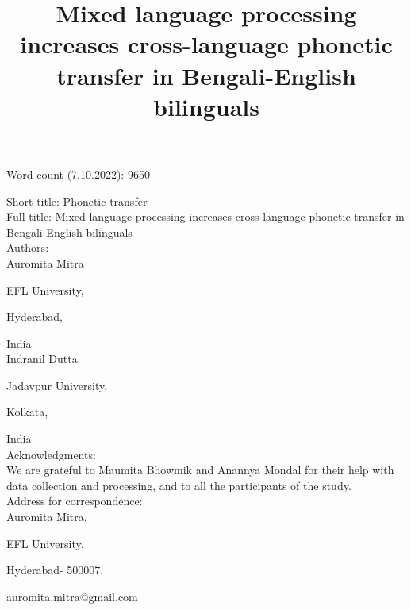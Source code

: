 \documentclass[12 pt]{article}
\title{Mixed language processing increases cross-language phonetic transfer in Bengali-English bilinguals}
\newlength\mystoreparindent
\newenvironment{myparindent}[1]{%
	\setlength{\mystoreparindent}{\the\parindent}
	\setlength{\parindent}{#1}
}{%
	\setlength{\parindent}{\mystoreparindent}
}
\begin{document}


Word count (7.10.2022): 9650 

\begin{singlespace}

\begin{myparindent}{0pt}
Short title: Phonetic transfer\\

Full title: Mixed language processing increases cross-language phonetic transfer in Bengali-English bilinguals\\

Authors:\\

Auromita Mitra

EFL University,

Hyderabad,

India\\

Indranil Dutta

Jadavpur University,

Kolkata,

India\\

Acknowledgments:\\
We are grateful to Maumita Bhowmik and Anannya Mondal for their help with data collection and processing, and to all the participants of the study.\\
 

Address for correspondence:\\
Auromita Mitra,

EFL University,

Hyderabad- 500007,

auromita.mitra@gmail.com

\end{myparindent}

\end{singlespace}
\end{document}
